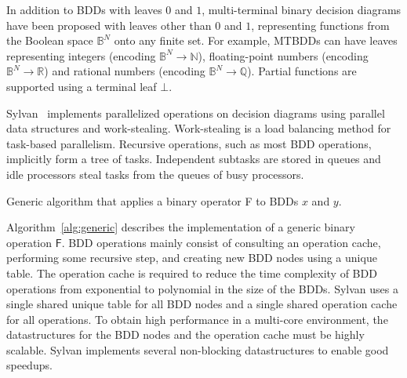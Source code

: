 In addition to BDDs with leaves $0$ and $1$, multi-terminal binary decision diagrams have been proposed with leaves other than $0$ and $1$, representing functions from the Boolean space $\mathbb{B}^N$ onto any finite set. For example, MTBDDs can have leaves representing integers (encoding $\mathbb{B}^N\rightarrow\mathbb{N}$), floating-point numbers (encoding $\mathbb{B}^N\rightarrow\mathbb{R}$) and rational numbers (encoding $\mathbb{B}^N\rightarrow\mathbb{Q}$).
Partial functions are supported using a terminal leaf $\bot$.%



Sylvan~\cite{DBLP:conf/tacas/DijkP15} implements parallelized operations on decision diagrams using parallel data structures and work-stealing.
Work-stealing is a load balancing method for task-based parallelism.
Recursive operations, such as most BDD operations, implicitly form a tree of tasks.
Independent subtasks are stored in queues and idle processors steal tasks from the queues of busy processors.


\begin{algorithm}[t!]
\caption{Generic algorithm that applies a binary operator \textsf{F} to BDDs $x$ and $y$.}
\label{alg:generic}
\end{algorithm}



Algorithm~\ref{alg:generic} describes the implementation of a generic binary operation $\textsf{F}$.
%
%
%
BDD operations mainly consist of consulting an operation cache, performing some recursive step, and creating new BDD nodes using a unique table.
The operation cache is required to reduce the time complexity of BDD operations from exponential to polynomial in the size of the BDDs.
Sylvan uses a single shared unique table for all BDD nodes and a single shared operation cache for all operations.
To obtain high performance in a multi-core environment, the datastructures for the BDD nodes and the operation cache must be highly scalable.
Sylvan implements several non-blocking datastructures to enable good speedups.



